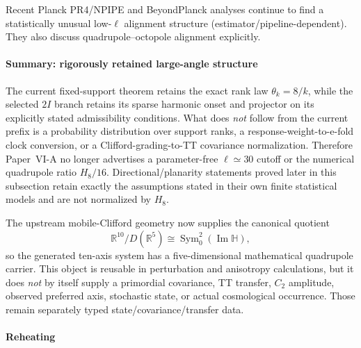 \documentclass[12pt,a4paper]{article}
\begin{document}
\begin{remark}
Recent Planck PR4/NPIPE and BeyondPlanck analyses continue to find a statistically
unusual low-$\ell$ alignment structure (estimator/\allowbreak pipeline-dependent). They
also discuss quadrupole--octopole alignment explicitly.
\end{remark}


\paragraph{Summary: rigorously retained large-angle structure}
\label{p8:subsec:bh-summary}

The current fixed-support theorem retains the exact rank law
\(\theta_k=8/k\), while the selected \(2I\) branch retains its sparse harmonic
onset and projector on its explicitly stated admissibility conditions.  What
does \emph{not} follow from the current prefix is a probability distribution
over support ranks, a response-weight-to-e-fold clock conversion, or a
Clifford-grading-to-TT covariance normalization.  Therefore Paper~VI-A no
longer advertises a parameter-free \(\ell\simeq30\) cutoff or the numerical
quadrupole ratio \(H_8/16\).  Directional/planarity statements proved later in
this subsection retain exactly the assumptions stated in their own finite
statistical models and are not normalized by \(H_8\).

\begin{remark}
\label{p8:rem:v285-ten-axis-quadrupole-carrier}
The upstream mobile-Clifford geometry now supplies the canonical quotient
\[
 \boxed{
 \mathbb R^{10}/D(\mathbb R^5)
 \cong\operatorname{Sym}^2_0(\operatorname{Im}\mathbb H),}
\]
so the generated ten-axis system has a five-dimensional mathematical
quadrupole carrier.  This object is reusable in perturbation and anisotropy
calculations, but it does \emph{not} by itself supply a primordial covariance,
TT transfer, \(C_2\) amplitude, observed preferred axis, stochastic state, or
actual cosmological occurrence.  Those remain separately typed
state/covariance/transfer data.
\end{remark}

\paragraph{Reheating}
\end{document}
